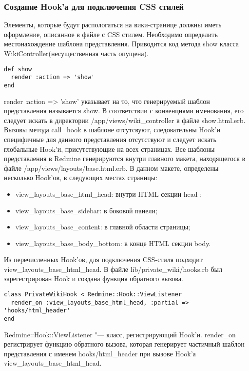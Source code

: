 \subsubsection{Создание Hook'а для подключения CSS стилей}
Элементы, которые будут распологаться на вики-странице должны иметь оформление,
описанное в файле с CSS стилем. Необходимо определить местонахождение шаблона
представления. Приводится код метода show  класса WikiController(несущественная
часть опущена).
\small{\begin{lstlisting}
def show
  render :action => 'show'
end
\end{lstlisting}}
render :action => 'show' указывает на то, что генерируемый шаблон представления
называется show. В соответствии с конвенциями именования, его следует искать в
директории /app/views/wiki\_controller в файле show.html.erb.
Вызовы метода call\_hook в шаблоне отсутсвуют, следовательны Hook'и специфичные
для данного представления отсутствуют и следует искать глобальные Hook'и,
присутствующие на всех страницах. Все шаблоны представления в Redmine
генерируются внутри главного макета, находящегося в файле
/app/views/layouts/base.html.erb. В данном макете, определены несколько
Hook'ов, в следующих местах страницы:
\begin{itemize}
  \item view\_layouts\_base\_html\_head: внутри HTML секции head ;
  \item view\_layouts\_base\_sidebar: в боковой панели;
  \item view\_layouts\_base\_content: в главной области страницы; 
  \item view\_layouts\_base\_body\_bottom: в конце HTML секции body.
\end{itemize}
Из перечисленных Hook'ов, для подключения CSS-стиля подходит
view\_layouts\_base\_html\_head. В файле lib/private\_wiki/hooks.rb был
зарегестрирован Hook и создана функция обратного вызова.
\small{\begin{lstlisting}
class PrivateWikiHook < Redmine::Hook::ViewListener
  render_on :view_layouts_base_html_head, :partial => 'hooks/html_header'
end
\end{lstlisting}}
Redmine::Hook::ViewListener "--- класс, регистрирующий Hook'и. render\_on
регистрирует функцию обратного вызова, которая генерирует частичный шаблон
представления с именем hooks/html\_header при вызове Hook'а
view\_layouts\_base\_html\_head.

